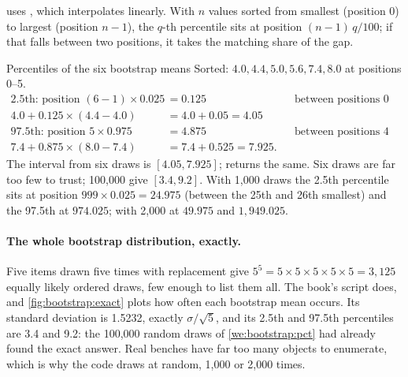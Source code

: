  uses , which interpolates linearly. With $n$ values sorted
from smallest (position 0) to largest (position $n - 1$), the $q$-th percentile sits at position $(n - 1)\,q/100$; if
that falls between two positions, it takes the matching share of the gap.

\begin{worked}[label={we:bootstrap:pct}]{Percentiles of the six bootstrap means}
Sorted: $4.0, 4.4, 5.0, 5.6, 7.4, 8.0$ at positions 0--5.
\begin{align*}
\text{2.5th: position } (6 - 1) \times 0.025 &= 0.125 && \text{between positions 0 and 1}\\
4.0 + 0.125 \times (4.4 - 4.0) &= 4.0 + 0.05 = 4.05\\
\text{97.5th: position } 5 \times 0.975 &= 4.875 && \text{between positions 4 and 5}\\
7.4 + 0.875 \times (8.0 - 7.4) &= 7.4 + 0.525 = 7.925.
\end{align*}
The interval from six draws is $[4.05, 7.925]$;  returns the same\tagC{}. Six draws are far too
few to trust; 100,000 give $[3.4, 9.2]$\tagC{}. With 1,000 draws the 2.5th percentile sits at position
$999 \times 0.025 = 24.975$ (between the 25th and 26th smallest) and the 97.5th at $974.025$; with 2,000 at $49.975$
and $1{,}949.025$.
\end{worked}

\paragraph{The whole bootstrap distribution, exactly.} Five items drawn five times with replacement give
$5^5 = 5 \times 5 \times 5 \times 5 \times 5 = 3{,}125$ equally likely ordered draws, few enough to list them all. The
book's script does, and \cref{fig:bootstrap:exact} plots how often each bootstrap mean occurs. Its standard deviation is
1.5232, exactly $\sigma/\sqrt5$, and its 2.5th and 97.5th percentiles are 3.4 and 9.2\tagC{}: the 100,000 random draws
of \cref{we:bootstrap:pct} had already found the exact answer. Real benches have far too many objects to enumerate, which
is why the code draws at random, 1,000 or 2,000 times.

